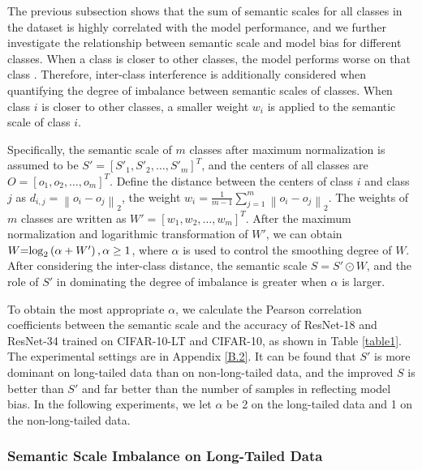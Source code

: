 \documentclass[10pt]{article} %
\begin{document}
The previous subsection shows that the sum of semantic scales for all classes in the dataset is highly correlated with the model performance, and we further investigate the relationship between semantic scale and model bias for different classes. When a class is closer to other classes, the model performs worse on that class \cite{paper34,paper44}. Therefore, inter-class interference is additionally considered when quantifying the degree of imbalance between semantic scales of classes. When class $i$ is closer to other classes, a smaller weight ${w_i}$ is applied to the semantic scale of class $i$.


Specifically, the semantic scale of $m$ classes after maximum normalization is assumed to be $S' = {\left[ {{S'_1},{S'_2}, \ldots ,{S'_m}} \right]^T}$, and the centers of all classes are $O = {\left[ {{o_1},{o_2}, \ldots ,{o_m}} \right]^T}$. Define the distance between the centers of class $i$ and class $j$ as ${d_{i,j}} = {\left\| {{o_i} - {o_j}} \right\|_2}$, the weight ${w_i} = \frac{1}{{m - 1}}\sum\nolimits_{j = 1}^m {{{\left\| {{o_i} - {o_j}} \right\|}_2}} $. The weights of $m$ classes are written as $W' = {\left[ {{w_1},{w_2}, \ldots ,{w_m}} \right]^T}$. After the maximum normalization and logarithmic transformation of $W'$, we can obtain $W{\rm{ = }}{\log _2}\left( {\alpha  + W'} \right),\alpha  \ge 1$, where $\alpha$ is used to control the smoothing degree of $W$. After considering the inter-class distance, the semantic scale $S = S' \odot W$, and the role of $S'$ in dominating the degree of imbalance is greater when $\alpha$ is larger. 


To obtain the most appropriate $\alpha$, we calculate the Pearson correlation coefficients between the semantic scale and the accuracy of ResNet-18 and ResNet-34 trained on CIFAR-10-LT and CIFAR-10, as shown in Table \ref{table1}. The experimental settings are in Appendix \ref{B.2}. It can be found that $S'$ is more dominant on long-tailed data than on non-long-tailed data, and the improved $S$ is better than $S'$ and far better than the number of samples in reflecting model bias. In the following experiments, we let $\alpha$ be 2 on the long-tailed data and 1 on the non-long-tailed data.

\subsubsection{Semantic Scale Imbalance on Long-Tailed Data}
\end{document}
